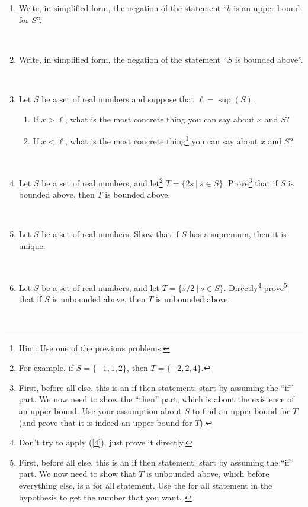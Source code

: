 \documentclass[12pt]{amsart}
\begin{document}
\begin{enumerate}
\item Write, in simplified form, the negation of the statement ``$b$ is an upper bound for $S$''.

\

\item\label{2} Write, in simplified form, the negation of the statement ``$S$ is bounded above''.

\

\item Let $S$ be a set of real numbers and suppose that $\ell=\sup(S)$. 
\begin{enumerate}
\item If $x > \ell$, what is the most concrete thing you can say about $x$ and $S$?
\item If $x < \ell$, what is the most concrete thing\footnote{Hint: Use one of the previous problems.} you can say about $x$ and $S$?
\end{enumerate}

\

\item\label{4} Let $S$ be a set of real numbers, and let\footnote{For example, if $S= \{-1,1,2\}$, then $T=\{-2,2,4\}$.} $T=\{ 2s \ | \ s\in S\}$. Prove\footnote{First, before all else, this is an if then statement: start by assuming the ``if'' part. We now need to show the ``then'' part, which is about the existence of an upper bound. Use your assumption about $S$ to find an upper bound for $T$ (and prove that it is indeed an upper bound for $T$).} that if $S$ is bounded above, then $T$ is bounded above.

\

\item Let $S$ be a set of real numbers. Show that if $S$ has a supremum, then it is unique.

\

\item Let $S$ be a set of real numbers, and let $T=\{ s/2 \ | \ s\in S\}$. Directly\footnote{Don't try to apply (\ref{4}), just prove it directly.} prove\footnote{First, before all else, this is an if then statement: start by assuming the ``if'' part. We now need to show that $T$ is unbounded above, which before everything else, is a for all statement. Use the for all statement in the hypothesis to get the number that you want\dots} that if $S$ is unbounded above, then $T$ is unbounded above.
\end{enumerate}

\
\end{document}
